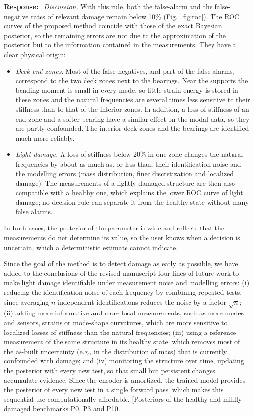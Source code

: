 \documentclass[11pt]{article}
\newenvironment{response}{\par\smallskip\noindent\color{resp}\textbf{Response:}\ }{\par}
\newcommand{\tbd}[1]{\textcolor{note}{\textsf{[#1]}}}
\begin{document}
\begin{response}
\textit{Discussion.} With this rule, both the false-alarm and the false-negative rates of relevant damage remain below
10\% (Fig.~\ref{fig:roc}). The ROC curves of the proposed method coincide with those of the exact Bayesian posterior, so
the remaining errors are not due to the approximation of the posterior but to the information contained in the
measurements. They have a clear physical origin:
\begin{itemize}[leftmargin=*]
\item \emph{Deck end zones.} Most of the false negatives, and part of the false alarms, correspond to the two deck zones
next to the bearings. Near the supports the bending moment is small in every mode, so little strain energy is stored in
these zones and the natural frequencies are several times less sensitive to their stiffness than to that of the interior
zones. In addition, a loss of stiffness of an end zone and a softer bearing have a similar effect on the modal data, so
they are partly confounded. The interior deck zones and the bearings are identified much more reliably.
\item \emph{Light damage.} A loss of stiffness below 20\% in one zone changes the natural frequencies by about as much as,
or less than, their identification noise and the modelling errors (mass distribution, finer discretization and localized
damage). The measurements of a lightly damaged structure are then also compatible with a healthy one, which explains the
lower ROC curve of light damage; no decision rule can separate it from the healthy state without many false alarms.
\end{itemize}
In both cases, the posterior of the parameter is wide and reflects that the measurements do not determine its value, so
the user knows when a decision is uncertain, which a deterministic estimate cannot indicate.

Since the goal of the method is to detect damage as early as possible,
we have added to the conclusions of the revised manuscript four lines of future work to make light damage identifiable
under measurement noise and modelling errors: (i) reducing the identification noise of each frequency by combining repeated tests, since averaging $n$ independent identifications reduces the noise by a factor $\sqrt{n}$; (ii) adding more informative and more local measurements, such as more modes and sensors, strains or mode-shape curvatures, which are more sensitive to localized losses of stiffness than the natural frequencies; (iii) using a reference measurement of the same structure in its healthy state, which removes most of the as-built uncertainty (e.g., in the distribution of mass) that is currently confounded with damage; and (iv) monitoring the structure over time, updating the posterior with every new test, so that small but persistent changes accumulate evidence. Since the encoder is amortized, the trained model provides the posterior of every new test in a single forward pass, which makes this sequential use computationally affordable.
\tbd{Posteriors of the healthy and mildly damaged benchmarks P0, P3 and P10.}
\end{response}
\end{document}

